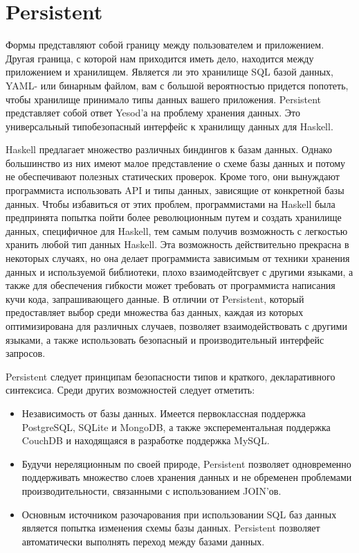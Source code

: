 \chapter{Persistent}\label{chap:persistent}

Формы представляют собой границу между пользователем и приложением. Другая граница, с которой нам приходится иметь дело, находится между приложением и хранилищем. Является ли это хранилище SQL базой данных, YAML- или бинарным файлом, вам с большой вероятностью придется попотеть, чтобы хранилище принимало типы данных вашего приложения. Persistent представляет собой ответ Yesod'а на проблему хранения данных. Это универсальный типобезопасный интерфейс к хранилищу данных для Haskell.

Haskell предлагает множество различных биндингов к базам данных. Однако большинство из них имеют малое представление о схеме базы данных и потому не обеспечивают полезных статических проверок. Кроме того, они вынуждают программиста использовать API и типы данных, зависящие от конкретной базы данных. Чтобы избавиться от этих проблем, программистами на Haskell была предпринята попытка пойти более революционным путем и создать хранилище данных, специфичное для Haskell, тем самым получив возможность с легкостью хранить любой тип данных Haskell. Эта возможность действительно прекрасна в некоторых случаях, но она делает программиста зависимым от техники хранения данных и используемой библиотеки, плохо взаимодейтсвует с другими языками, а также для обеспечения гибкости может требовать от программиста написания кучи кода, запрашивающего данные. В отличии от Persistent, который предоставляет выбор среди множества баз данных, каждая из которых оптимизирована для различных случаев, позволяет взаимодействовать с другими языками, а также использовать безопасный и производительный интерфейс запросов.

Persistent следует принципам безопасности типов и краткого, декларативного синтексиса. Среди других возможностей следует отметить:

\begin{itemize}
  \item Независимость от базы данных. Имеется первоклассная поддержка PostgreSQL, SQLite и MongoDB, а также эксперементальная поддержка CouchDB и находящаяся в разработке поддержка MySQL.
  \item Будучи нереляционным по своей природе, Persistent позволяет одновременно поддерживать множество слоев хранения данных и не обременен проблемами производительности, связанными с использованием JOIN'ов.
  \item Основным источником разочарования при использовании SQL баз данных является попытка изменения схемы базы данных. Persistent позволяет автоматически выполнять переход между базами данных. %
\end{itemize}


